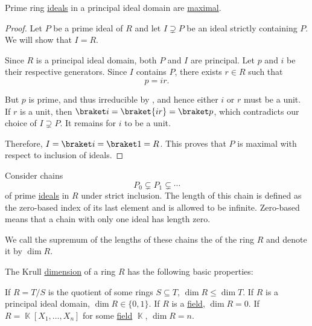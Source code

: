 \begin{proposition}\label{thm:prime_ideals_are_maximal_in_pid}
  Prime ring \hyperref[def:prime_ring_ideal]{ideals} in a principal ideal domain are \hyperref[def:maximal_ring_ideal]{maximal}.
\end{proposition}
\begin{proof}
  Let \( P \) be a prime ideal of \( R \) and let \( I \supsetneq P \) be an ideal strictly containing \( P \). We will show that \( I = R \).

  Since \( R \) is a principal ideal domain, both \( P \) and \( I \) are principal. Let \( p \) and \( i \) be their respective generators. Since \( I \) contains \( P \), there exists \( r \in R \) such that
  \begin{equation*}
    p = ir.
  \end{equation*}

  But \( p \) is prime, and thus irreducible by , and hence either \( i \) or \( r \) must be a unit. If \( r \) is a unit, then \( \braket i = \braket {ir} = \braket p \), which contradicts our choice of \( I \supsetneq P \). It remains for \( i \) to be a unit.

  Therefore, \( I = \braket i = \braket 1 = R \). This proves that \( P \) is maximal with respect to inclusion of ideals.
\end{proof}

\begin{definition}\label{def:krull_dimension}
  Consider chains
  \begin{equation*}
    P_0 \subsetneq P_1 \subsetneq \cdots
  \end{equation*}
  of prime \hyperref[def:prime_ring_ideal]{ideals} in \( R \) under strict inclusion. The length of this chain is defined as the zero-based index of its last element and is allowed to be infinite. Zero-based means that a chain with only one ideal has length zero.

  We call the supremum of the lengths of these chains the  of the ring \( R \) and denote it by \( \dim R \).
\end{definition}

\begin{proposition}\label{thm:def:krull_dimension/properties}
  The Krull \hyperref[def:krull_dimension]{dimension} of a ring \( R \) has the following basic properties:
  \begin{thmenum}
     If \( R = T / S \) is the quotient of some rings \( S \subseteq T \), \( \dim R \leq \dim T \).
     If \( R \) is a principal ideal domain, \( \dim R \in \{ 0, 1 \} \).
     If \( R \) is a \hyperref[def:field]{field}, \( \dim R = 0 \).
    \cite[exercise 8.19]{КоцевСидеров2016} If \( R = \BbbK[X_1, \ldots, X_n] \) for some \hyperref[def:field]{field} \( \BbbK \), \( \dim R = n \).
  \end{thmenum}
\end{proposition}

